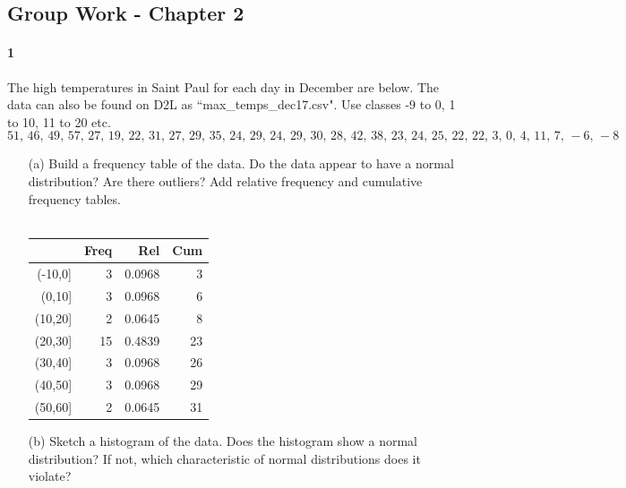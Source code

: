 \documentclass{article}
\begin{document}
\begin{flushleft}
\section*{Group Work - Chapter 2}
\paragraph{1} The high temperatures in Saint Paul for each day in December are below. The data can also be found on D2L as ``max\_temps\_dec17.csv". Use classes -9 to 0, 1 to 10, 11 to 20 etc. 
\[51 ,\, 46 ,\, 49 ,\, 57 ,\, 27 ,\, 19 ,\, 22 ,\, 31 ,\, 27 ,\, 29 ,\, 35 ,\, 24 ,\, 29 ,\, 24 ,\, 29 ,\, 30 ,\, 28 ,\, 42 ,\, 38 ,\, 23 ,\, 24 ,\, 25 ,\, 22 ,\, 22  ,\, 3  ,\, 0  ,\, 4 ,\, 11  ,\, 7 ,\, -6 ,\, -8\]
\begin{itemize}
\item [(a)] Build a frequency table of the data. Do the data appear to have a normal distribution? Are there outliers? Add relative frequency and cumulative frequency tables.\\
\bigskip
{}\\
\bigskip

{\centering
\begin{tabular}{rrrr}
  \hline
 & Freq & Rel & Cum \\ 
  \hline
(-10,0] & 3 & 0.0968 & 3 \\ 
  (0,10] & 3 & 0.0968 & 6 \\ 
  (10,20] & 2 & 0.0645 & 8 \\ 
  (20,30] & 15 & 0.4839 & 23 \\ 
  (30,40] & 3 & 0.0968 & 26 \\ 
  (40,50] & 3 & 0.0968 & 29 \\ 
  (50,60] & 2 & 0.0645 & 31 \\ 
   \hline
\end{tabular}\par}
\vspace{.5in}
\item[(b)] Sketch a histogram of the data. Does the histogram show a normal distribution? If not, which characteristic of normal distributions does it violate?\\
\bigskip
{}
\bigskip


\end{itemize}
\end{flushleft}
\end{document}
